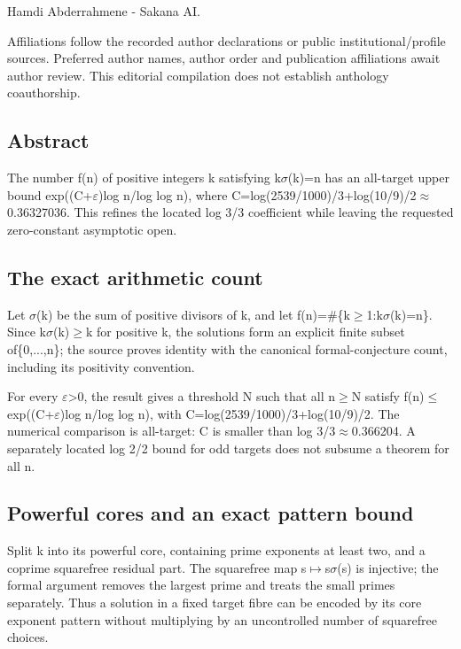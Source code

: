 \documentclass[11pt,a4paper]{article}
\begin{document}
{\small Hamdi Abderrahmene  -  Sakana AI.\par}

{\small Affiliations follow the recorded author declarations or public institutional/profile sources. Preferred author names, author order and publication affiliations await author review. This editorial compilation does not establish anthology coauthorship.\par}

\subsection{Abstract}
The number f(n) of positive integers k satisfying k\ensuremath{\sigma}(k)=n has an all-target upper bound exp((C+\ensuremath{\varepsilon})log n/log log n), where C=log(2539/1000)/3+log(10/9)/2\ensuremath{\approx}0.36327036. This refines the located log 3/3 coefficient while leaving the requested zero-constant asymptotic open.

\subsection{The exact arithmetic count}
Let \ensuremath{\sigma}(k) be the sum of positive divisors of k, and let f(n)=\#\{k\ensuremath{\geq}1:k\ensuremath{\sigma}(k)=n\}. Since k\ensuremath{\sigma}(k)\ensuremath{\geq}k for positive k, the solutions form an explicit finite subset of\{0,...,n\}; the source proves identity with the canonical formal-conjecture count, including its positivity convention.

For every \ensuremath{\varepsilon}>0, the result gives a threshold N such that all n\ensuremath{\geq}N satisfy f(n)\ensuremath{\leq}exp((C+\ensuremath{\varepsilon})log n/log log n), with C=log(2539/1000)/3+log(10/9)/2. The numerical comparison is all-target: C is smaller than log 3/3\ensuremath{\approx}0.366204. A separately located log 2/2 bound for odd targets does not subsume a theorem for all n.

\subsection{Powerful cores and an exact pattern bound}
Split k into its powerful core, containing prime exponents at least two, and a coprime squarefree residual part. The squarefree map s\ensuremath{\mapsto}s\ensuremath{\sigma}(s) is injective; the formal argument removes the largest prime and treats the small primes separately. Thus a solution in a fixed target fibre can be encoded by its core exponent pattern without multiplying by an uncontrolled number of squarefree choices.
\end{document}
